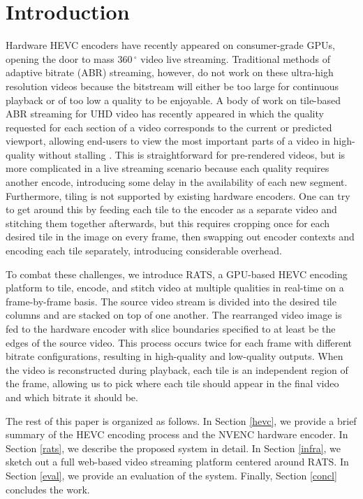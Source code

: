 
\section{Introduction} \label{intro}

Hardware HEVC encoders have recently appeared on consumer-grade GPUs, opening the door to mass $360\,^{\circ}$ video live streaming. Traditional methods of adaptive bitrate (ABR) streaming, however, do not work on these ultra-high resolution videos because the bitstream will either be too large for continuous playback or of too low a quality to be enjoyable. A body of work on tile-based ABR streaming for UHD video has recently appeared in which the quality requested for each section of a video corresponds to the current or predicted viewport, allowing end-users to view the most important parts of a video in high-quality without stalling \cite{lefeuvre2016} \cite{corbillon2016} \cite{corbillon2018}. This is straightforward for pre-rendered videos, but is more complicated in a live streaming scenario because each quality requires another encode, introducing some delay in the availability of each new segment. Furthermore, tiling is not supported by existing hardware encoders. One can try to get around this by feeding each tile to the encoder as a separate video and stitching them together afterwards, but this requires cropping once for each desired tile in the image on every frame, then swapping out encoder contexts and encoding each tile separately, introducing considerable overhead.

To combat these challenges, we introduce RATS, a GPU-based HEVC encoding platform to tile, encode, and stitch video at multiple qualities in real-time on a frame-by-frame basis. The source video stream is divided into the desired tile columns and are stacked on top of one another. The rearranged video image is fed to the hardware encoder with slice boundaries specified to at least be the edges of the source video. This process occurs twice for each frame with different bitrate configurations, resulting in high-quality and low-quality outputs. When the video is reconstructed during playback, each tile is an independent region of the frame, allowing us to pick where each tile should appear in the final video and which bitrate it should be.

The rest of this paper is organized as follows. In Section \ref{hevc}, we provide a brief summary of the HEVC encoding process and the NVENC hardware encoder. In Section \ref{rats}, we describe the proposed system in detail. In Section \ref{infra}, we sketch out a full web-based video streaming platform centered around RATS. In Section \ref{eval}, we provide an evaluation of the system. Finally, Section \ref{concl} concludes the work.

